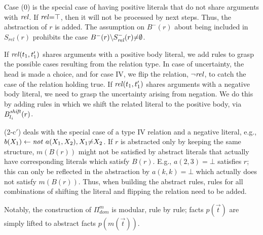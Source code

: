 \documentclass{new_tlp}
\def\mi#1{\mathit{#1\/}}
\begin{document}
Case (0) is the special case of having positive literals that do not share arguments with $\mi{rel}$. If $\mi{rel}{=}\top$, then it will not be processed by next steps. Thus, the abstraction of $r$ is added. The assumption on $B^-(r)$ about being included in $S_{rel}(r)$ prohibits the case $B^-(r){\setminus} S^-_{\mi{rel}}(r){\neq} \emptyset$. 


If $\mi{rel}(t_1,t'_1)$ shares arguments with a positive body literal, we add
rules to grasp the possible cases resulting from the relation type. In
case of uncertainty, 
the head is made a choice,
and for case IV, we flip the relation, $\neg\mi{rel}$, to catch the
case of the relation holding true. If $\mi{rel}(t_1,t'_1)$ shares arguments with
a negative body literal, we need to 
grasp the
uncertainty arising
from negation. We do this by adding rules in which we shift the
related literal to 
the positive body, via $B^{\mi{shift}}_{l_i}(r)$.

(2-c$'$) deals with the special case of
a type IV relation and a negative literal, e.g., $b(X_1) \leftarrow
\mi{not}\ a(X_1,X_2), X_1 {\neq} X_2$. If %
$r$ 
is abstracted only
by keeping the same structure, %
$m(B(r))$ 
might not be
satisfied by abstract literals that actually have corresponding
literals which satisfy %
$B(r)$. 
E.g., $a(2,3){=}\bot$
satisfies $r$; this can only be reflected in the abstraction by
$a(k,k){=}\bot$ which actually %
does 
not satisfy %
$m(B(r))$. 
Thus, 
when building the abstract rules, rules 
for all combinations of shifting the literal and flipping the relation need to be added. %

Notably, the construction of $\Pi^m_{dom}$ is modular, rule by
rule;
facts $p(\vec{t})$ are simply lifted to abstract facts $p(m(\vec{t}))$. 
\end{document}
